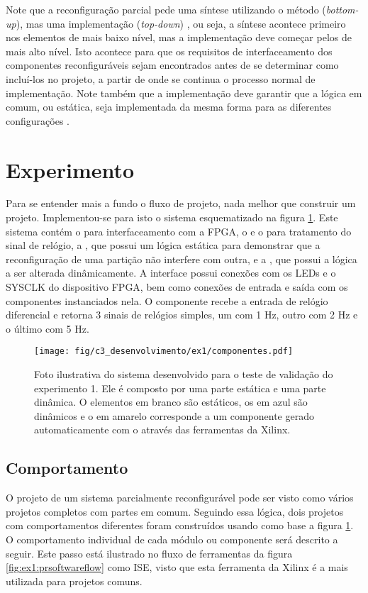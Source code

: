 \documentclass[11pt,a4paper,oneside]{book}
\begin{document}
Note que a reconfiguração parcial pede uma síntese utilizando o método  (\textit{bottom-up}), mas uma implementação  (\textit{top-down}) \cite{ug743}, ou seja, a síntese acontece primeiro nos elementos de mais baixo nível, mas a implementação deve começar pelos de mais alto nível.
Isto acontece para que os requisitos de interfaceamento dos componentes reconfiguráveis sejam encontrados antes de se determinar como incluí-los no projeto, a partir de onde se continua o processo normal de implementação.
Note também que a implementação deve garantir que a lógica em comum, ou estática, seja implementada da mesma forma para as diferentes configurações \cite{ug702}.

\section{Experimento}
Para se entender mais a fundo o fluxo de projeto, nada melhor que construir um projeto.
Implementou-se para isto o sistema esquematizado na figura \ref{fig:ex1:componentes}.
Este sistema contém o  para interfaceamento com a FPGA, o  e o  para tratamento do sinal de relógio, a , que possui um lógica estática para demonstrar que a reconfiguração de uma partição não interfere com outra, e a , que possui a lógica a ser alterada dinâmicamente.
A interface  possui conexões com os LEDs e o SYSCLK do dispositivo FPGA, bem como conexões de entrada e saída com os componentes instanciados nela.
O componente  recebe a entrada de relógio diferencial e retorna 3 sinais de relógios simples, um com 1 Hz, outro com 2 Hz e o último com 5 Hz.

\begin{figure}[h]
\centering
\texttt{[image: fig/c3\_desenvolvimento/ex1/componentes.pdf]}
\caption{Foto ilustrativa do sistema desenvolvido para o teste de validação do experimento 1. Ele é composto por uma parte estática e uma parte dinâmica. O elementos em branco são estáticos, os em azul são dinâmicos e o em amarelo corresponde a um componente gerado automaticamente com o através das ferramentas da Xilinx.}
\label{fig:ex1:componentes}
\end{figure}

\subsection{Comportamento}
O projeto de um sistema parcialmente reconfigurável pode ser visto como vários projetos completos com partes em comum.
Seguindo essa lógica, dois projetos com comportamentos diferentes foram construídos usando como base a figura \ref{fig:ex1:componentes}.
O comportamento individual de cada módulo ou componente será descrito a seguir.
Este passo está ilustrado no fluxo de ferramentas da figura \ref{fig:ex1:prsoftwareflow} como ISE, visto que esta ferramenta da Xilinx é a mais utilizada para projetos comuns.
\end{document}
